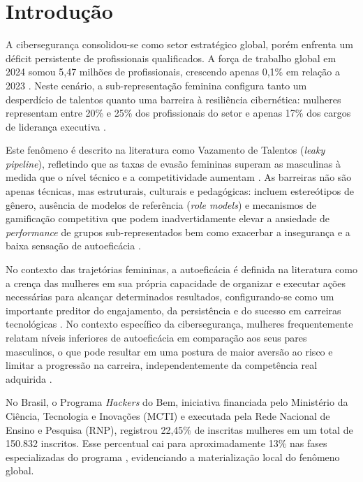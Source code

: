 \documentclass[12pt]{article}
\begin{document}
\section{Introdução}

A cibersegurança consolidou-se como setor estratégico global, porém enfrenta um déficit persistente de profissionais qualificados. A força de trabalho global em 2024 somou 5,47 milhões de profissionais, crescendo apenas 0,1\% em relação a 2023 \cite{ISC2_2024}. Neste cenário, a sub-representação feminina configura tanto um desperdício de talentos quanto uma barreira à resiliência cibernética: mulheres representam entre 20\% e 25\% dos profissionais do setor e apenas 17\% dos cargos de liderança executiva \cite{ISC2_2025, Fortinet2025}.

Este fenômeno é descrito na literatura como Vazamento de Talentos (\textit{leaky pipeline}), refletindo que as taxas de evasão femininas superam as masculinas à medida que o nível técnico e a competitividade aumentam \cite{Pitman2022}. As barreiras não são apenas técnicas, mas estruturais, culturais e pedagógicas: incluem estereótipos de gênero, ausência de modelos de referência (\textit{role models}) e mecanismos de gamificação competitiva que podem inadvertidamente elevar a ansiedade de \textit{performance} de grupos sub-representados \cite{SelmanHousein2025, Hogan2025, Horcher2021} bem como exacerbar a insegurança e a baixa sensação de autoeficácia \cite{Kanij2025}.

No contexto das trajetórias femininas, a autoeficácia é definida na literatura como a crença das mulheres em sua própria capacidade de organizar e executar ações necessárias para alcançar determinados resultados, configurando-se como um importante preditor do engajamento, da persistência e do sucesso em carreiras tecnológicas \cite{Pacheco2024}. No contexto específico da cibersegurança, mulheres frequentemente relatam níveis inferiores de autoeficácia em comparação aos seus pares masculinos, o que pode resultar em uma postura de maior aversão ao risco e limitar a progressão na carreira, independentemente da competência real adquirida \cite{SelmanHousein2025}.

No Brasil, o Programa \textit{Hackers} do Bem, iniciativa financiada pelo Ministério da Ciência, Tecnologia e Inovações (MCTI) e executada pela Rede Nacional de Ensino e Pesquisa (RNP), registrou 22,45\% de inscritas mulheres em um total de 150.832 inscritos. Esse percentual cai para aproximadamente 13\% nas fases especializadas do programa \cite{HackersDoBemManual}, evidenciando a materialização local do fenômeno global.
\end{document}
